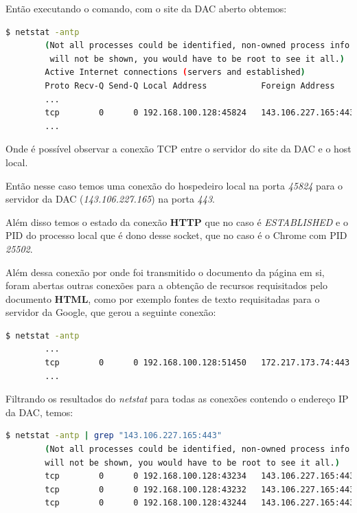 \documentclass[12pt,a4paper]{report}
\begin{document}
Então executando o comando, com o site da DAC aberto obtemos:

\begin{lstlisting}[language=bash]
        $ netstat -antp   
        (Not all processes could be identified, non-owned process info
         will not be shown, you would have to be root to see it all.)
        Active Internet connections (servers and established)
        Proto Recv-Q Send-Q Local Address           Foreign Address         State       PID/Program name    
        ...
        tcp        0      0 192.168.100.128:45824   143.106.227.165:443     ESTABLISHED 25502/chrome --type 
        ...
\end{lstlisting}

Onde é possível observar a conexão TCP entre o servidor do site da DAC e o host local.

Então nesse caso temos uma conexão do hospedeiro local na porta \emph{45824} para o servidor da DAC (\emph{143.106.227.165}) na porta \emph{443}.

Além disso temos o estado da conexão \textbf{HTTP} que no caso é \emph{ESTABLISHED} e o PID do processo local que é dono desse socket, que no caso é o Chrome com PID \emph{25502}.

Além dessa conexão por onde foi transmitido o documento da página em si, foram abertas outras conexões para a obtenção de recursos requisitados pelo documento \textbf{HTML}, como por exemplo fontes de texto requisitadas para o servidor da Google, que gerou a seguinte conexão:

\begin{lstlisting}[language=bash]
        $ netstat -antp   
        ...
        tcp        0      0 192.168.100.128:51450   172.217.173.74:443      ESTABLISHED 25502/chrome --type 
        ...
\end{lstlisting}

Filtrando os resultados do \emph{netstat} para todas as conexões contendo o endereço IP da DAC, temos:

\begin{lstlisting}[language=bash]
        $ netstat -antp | grep "143.106.227.165:443"  
        (Not all processes could be identified, non-owned process info
        will not be shown, you would have to be root to see it all.)
        tcp        0      0 192.168.100.128:43234   143.106.227.165:443     ESTABLISHED 5429/chrome --type= 
        tcp        0      0 192.168.100.128:43232   143.106.227.165:443     ESTABLISHED 5429/chrome --type= 
        tcp        0      0 192.168.100.128:43244   143.106.227.165:443     ESTABLISHED 5429/chrome --type= 
\end{lstlisting}
\end{document}
